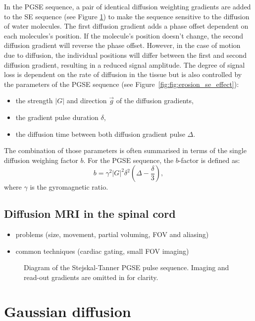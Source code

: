 In the PGSE sequence, a pair of identical diffusion weighting gradients are added to the SE sequence (see Figure \ref{fig:pgse_diagram}) to make the sequence sensitive to the diffusion of water molecules. The first diffusion gradient adds a phase offset dependent on each molecules's position. If the molecule's position doesn't change, the second diffusion gradient will reverse the phase offset. However, in the case of motion due to diffusion, the individual positions will differ between the first and second diffusion gradient, resulting in a reduced signal amplitude. The degree of signal loss is dependent on the rate of diffusion in the tissue but is also controlled by the parameters of the PGSE sequence (see Figure~\ref{fig:fig:erosion_se_effect}):
\begin{itemize}
	\item the strength $|G|$ and direction $\vec{g}$ of the diffusion gradients,
	\item the gradient pulse duration $\delta$,
	\item the diffusion time between both diffusion gradient pulse $\Delta$.
\end{itemize}

The combination of those parameters is often summarised in terms of the single diffusion weighing factor $b$. For the PGSE sequence, the $b$-factor is defined as:
\begin{equation}
	b = \gamma^2|G|^2\delta^2(\Delta-\frac{\delta}{3}),
    \label{eq:bvalue}
\end{equation}
where $\gamma$ is the gyromagnetic ratio.
\subsection*{Diffusion MRI in the spinal cord}
\begin{itemize}
	\item problems (size, movement, partial voluming, FOV and aliasing)
	\item common techniques (cardiac gating, small FOV imaging)
\end{itemize}

\begin{figure}
 \centering
  \caption{Diagram of the Stejskal-Tanner PGSE pulse sequence. Imaging and read-out gradients are omitted in for clarity.}
  \label{fig:pgse_diagram}
\end{figure}


\section{Gaussian diffusion}
\label{sec:gaussian_diffusion}
